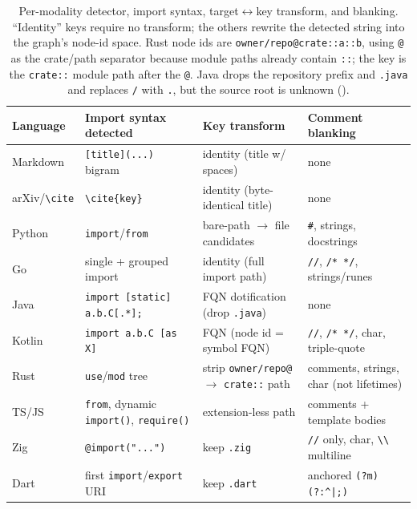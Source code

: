 \begin{table}[t]
  \centering
  \small
  \begin{tabular}{@{}llll@{}}
    \toprule
    Language & Import syntax detected & Key transform & Comment blanking \\
    \midrule
    Markdown   & \texttt{[title](...)} bigram & identity (title w/ spaces) & none \\
    arXiv/\texttt{\textbackslash cite} & \texttt{\textbackslash cite\{key\}} & identity (byte-identical title) & none \\
    Python     & \texttt{import}/\texttt{from} & bare-path $\to$ file candidates & \texttt{\#}, strings, docstrings \\
    Go         & single + grouped import & identity (full import path) & \texttt{//}, \texttt{/*\,*/}, strings/runes \\
    Java       & \texttt{import [static] a.b.C[.*];} & FQN dotification (drop \texttt{.java}) & none \\
    Kotlin     & \texttt{import a.b.C [as X]} & FQN (node id = symbol FQN) & \texttt{//}, \texttt{/*\,*/}, char, triple-quote \\
    Rust       & \texttt{use}/\texttt{mod} tree & strip \texttt{owner/repo@} $\to$ \texttt{crate::} path & comments, strings, char (not lifetimes) \\
    TS/JS      & \texttt{from}, dynamic \texttt{import()}, \texttt{require()} & extension-less path & comments + template bodies \\
    Zig        & \texttt{@import("...")} & keep \texttt{.zig} & \texttt{//} only, char, \texttt{\textbackslash\textbackslash} multiline \\
    Dart       & first \texttt{import}/\texttt{export} URI & keep \texttt{.dart} & anchored \texttt{(?m)(?:\^{}|;)} \\
    \bottomrule
  \end{tabular}
  \caption{Per-modality detector, import syntax, target$\leftrightarrow$key
  transform, and blanking. ``Identity'' keys require no transform; the others
  rewrite the detected string into the graph's node-id space. Rust node ids are
  \texttt{owner/repo@crate::a::b}, using \texttt{@} as the crate/path separator
  because module paths already contain \texttt{::}; the key is the \texttt{crate::}
  module path after the \texttt{@}. Java drops the repository prefix and
  \texttt{.java} and replaces \texttt{/} with \texttt{.}, but the source root is
  unknown ().}
  \label{tab:linkdet}
\end{table}

